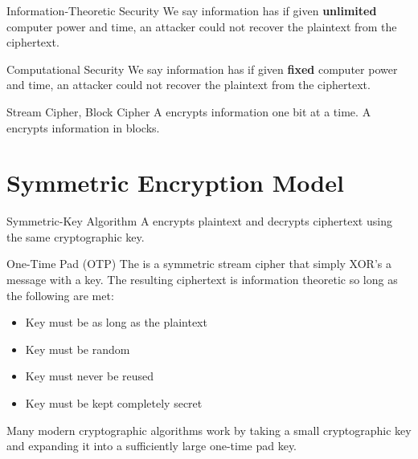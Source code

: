 \documentclass[code]{amznotes}
\begin{document}
\begin{dfnbox}{Information-Theoretic Security}{}
    We say information has  if given \textbf{unlimited} computer power and time, an attacker could not recover the plaintext from the ciphertext.
\end{dfnbox}

\begin{dfnbox}{Computational Security}{}
    We say information has  if given \textbf{fixed} computer power and time, an attacker could not recover the plaintext from the ciphertext.
\end{dfnbox}

\begin{dfnbox}{Stream Cipher, Block Cipher}{}
    A  encrypts information one bit at a time.     A  encrypts information in blocks.
\end{dfnbox}

\section{Symmetric Encryption Model}

\begin{dfnbox}{Symmetric-Key Algorithm}{}
    A  encrypts plaintext and decrypts ciphertext using the same cryptographic key.
\end{dfnbox}

\begin{dfnbox}{One-Time Pad (OTP)}{}
    The  is a symmetric stream cipher that simply XOR's a message with a key. The resulting ciphertext is information theoretic so long as the following are met:
    \begin{itemize}[noitemsep]
        \item Key must be as long as the plaintext
        \item Key must be random
        \item Key must never be reused
        \item Key must be kept completely secret
   \end{itemize}
\end{dfnbox}

Many modern cryptographic algorithms work by taking a small cryptographic key and expanding it into a sufficiently large one-time pad key.
\end{document}
